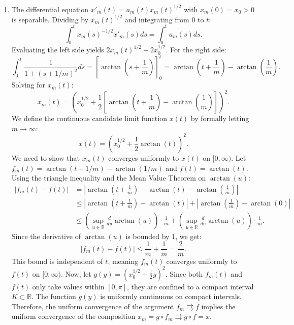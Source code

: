 \documentclass[10pt,a4paper]{article}
\begin{document}
\begin{enumerate}[label=\fbox{\arabic*}]
  \item %
        The differential equation $x'_m(t) = a_m(t) x_m(t)^{1/2}$ with $x_m(0) = x_0 > 0$ is separable. Dividing by $x_m(t)^{1/2}$ and integrating from $0$ to $t$:
        \[
          \int_0^t x_m(s)^{-1/2} x'_m(s) ds = \int_0^t a_m(s) ds.
        \]
        Evaluating the left side yields $2x_m(t)^{1/2} - 2x_0^{1/2}$. For the right side:
        \[
          \int_0^t \frac{1}{1 + (s + 1/m)^2} ds = \left[ \arctan\left(s + \frac{1}{m}\right) \right]_0^t = \arctan\left(t + \frac{1}{m}\right) - \arctan\left(\frac{1}{m}\right).
        \]
        Solving for $x_m(t)$:
        \[
          x_m(t) = \left( x_0^{1/2} + \frac{1}{2} \left[ \arctan\left(t + \frac{1}{m}\right) - \arctan\left(\frac{1}{m}\right) \right] \right)^2.
        \]
        We define the continuous candidate limit function $x(t)$ by formally letting $m \to \infty$:
        \[
          x(t) = \left( x_0^{1/2} + \frac{1}{2} \arctan(t) \right)^2.
        \]
        We need to show that $x_m(t)$ converges uniformly to $x(t)$ on $[0, \infty)$. Let $f_m(t) = \arctan(t + 1/m) - \arctan(1/m)$ and $f(t) = \arctan(t)$.
        Using the triangle inequality and the Mean Value Theorem on $\arctan(u)$:
        \begin{align*}
          |f_m(t) - f(t)| &= \left| \arctan\left(t + \frac{1}{m}\right) - \arctan(t) - \arctan\left(\frac{1}{m}\right) \right| \\
          &\le \left| \arctan\left(t + \frac{1}{m}\right) - \arctan(t) \right| + \left| \arctan\left(\frac{1}{m}\right) - \arctan(0) \right| \\
          &\le \left( \sup_{u \in \mathbb{R}} \frac{d}{du}\arctan(u) \right) \cdot \frac{1}{m} + \left( \sup_{u \in \mathbb{R}} \frac{d}{du}\arctan(u) \right) \cdot \frac{1}{m}.
        \end{align*}
        Since the derivative of $\arctan(u)$ is bounded by 1, we get:
        \[
          |f_m(t) - f(t)| \le \frac{1}{m} + \frac{1}{m} = \frac{2}{m}.
        \]
        This bound is independent of $t$, meaning $f_m(t)$ converges uniformly to $f(t)$ on $[0, \infty)$.
        Now, let $g(y) = \left( x_0^{1/2} + \frac{1}{2} y \right)^2$. Since both $f_m(t)$ and $f(t)$ only take values within $[0, \pi]$, they are confined to a compact interval $K \subset \mathbb{R}$. The function $g(y)$ is uniformly continuous on compact intervals. Therefore, the uniform convergence of the argument $f_m \rightrightarrows f$ implies the uniform convergence of the composition $x_m = g \circ f_m \rightrightarrows g \circ f = x$.

\end{enumerate}
\end{document}
